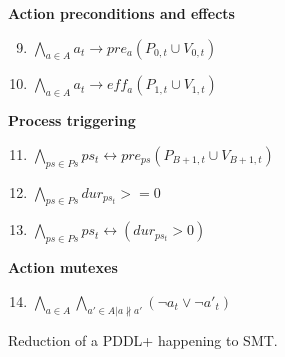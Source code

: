 \begin{figure*}[thb!]
\textbf{Action preconditions and effects}
\begin{enumerate}[label=H\arabic*.]\setcounter{enumi}{8}
 \item $\bigwedge_{a \in A} a_t \rightarrow pre_{a}(P_{0,t} \cup V_{0,t})$
 \item $\bigwedge_{a \in A} a_t \rightarrow eff_{a}(P_{1,t} \cup V_{1,t})$
\end{enumerate}
\textbf{Process triggering}
\begin{enumerate}[label=H\arabic*.]\setcounter{enumi}{10}
 \item $\bigwedge_{ps\in Ps} ps_t \leftrightarrow pre_{ps}(P_{B+1,t} \cup V_{B+1,t})$
 \item $\bigwedge_{ps\in Ps} dur_{ps_t} >= 0$
 \item $\bigwedge_{ps\in Ps} ps_t \leftrightarrow (dur_{ps_t} > 0)$
\end{enumerate}
\textbf{Action mutexes}
\begin{enumerate}[label=H\arabic*.]\setcounter{enumi}{13}
 \item $\bigwedge_{a \in A} \bigwedge_{a' \in A | a \nparallel a'} (\neg a_t \vee \neg a'_t)$
\end{enumerate}
\caption{Reduction of a PDDL+ happening to SMT.}
\label{eq:state}
\end{figure*}

\smallskip

